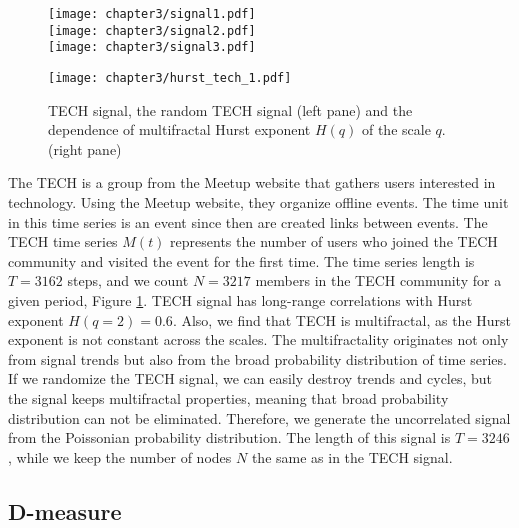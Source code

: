 \begin{figure}[ht]
	\centering
	\begin{minipage}[b]{0.4\textwidth}
		\centering
		\texttt{[image: chapter3/signal1.pdf]}\\
		\texttt{[image: chapter3/signal2.pdf]}\\
		\texttt{[image: chapter3/signal3.pdf]}
		
	\end{minipage}
	\begin{minipage}[b]{0.45\textwidth}
		\centering
		\texttt{[image: chapter3/hurst\_tech\_1.pdf]}
		\vspace{1cm}
	\end{minipage}
	\caption[Properties of the TECH and Poisson signals.]{TECH signal, the random TECH signal (left pane) and the dependence of multifractal Hurst exponent $H(q)$ of the scale $q$. (right pane)}
	\label{fig:tech_signals}
\end{figure}

The TECH is a group from the Meetup website that gathers users interested in technology. Using the Meetup website, they organize offline events. The time unit in this time series is an event since then are created links between events. The TECH time series $M(t)$ represents the number of users who joined the TECH community and visited the event for the first time. The time series length is $T=3162$ steps, and we count $N=3217$ members in the TECH community for a given period, Figure \ref{fig:tech_signals}. TECH signal has long-range correlations with Hurst exponent $H(q=2)=0.6$. Also, we find that TECH is multifractal, as the Hurst exponent is not constant across the scales. The multifractality originates not only from signal trends but also from the broad probability distribution of time series. If we randomize the TECH signal, we can easily destroy trends and cycles, but the signal keeps multifractal properties, meaning that broad probability distribution can not be eliminated. Therefore, we generate the uncorrelated signal from the Poissonian probability distribution. The length of this signal is  $T = 3246$, while we keep the number of nodes $N$ the same as in the TECH signal.


\subsection{D-measure}

